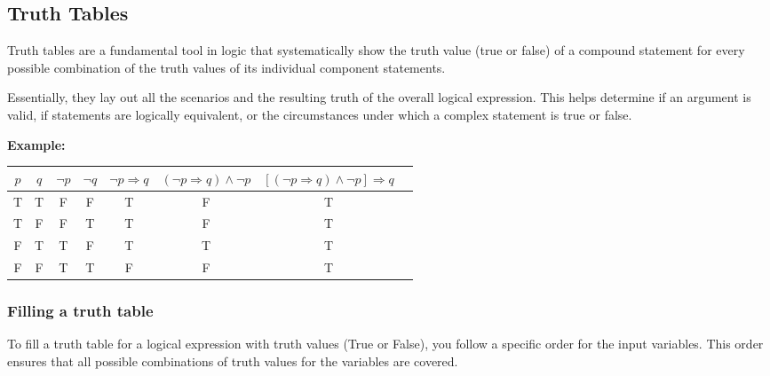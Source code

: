 \subsection{Truth Tables}

Truth tables are a fundamental tool in logic that systematically show the truth value
(true or false) of a compound statement for every possible combination of the truth values of 
its individual component statements.
\vspace{\baselineskip}

Essentially, they lay out all the scenarios and the resulting truth of the overall logical expression.
This helps determine if an argument is valid, if statements are logically equivalent, or the circumstances
under which a complex statement is true or false.
\vspace{\baselineskip}

\textbf{Example:}
\vspace{\baselineskip}


\begin{center}
	\begin{tabular}{|c|c|c|c|c|c|c|c|}
		\hline
		\(p\) & \(q\) & \(\neg p\) & \(\neg q\) & \(\neg p \Rightarrow q\) & \((\neg p \Rightarrow q) \land \neg p\) & \(\left[(\neg p \Rightarrow q) \land \neg p\right] \Rightarrow q\) \\
		\hline
		T   & T   & F        & F        & T                      & F                                     & T                                                                \\
		T   & F   & F        & T        & T                      & F                                     & T                                                                \\
		F   & T   & T        & F        & T                      & T                                     & T                                                                \\
		F   & F   & T        & T        & F                      & F                                     & T                                                                \\
		\hline
	\end{tabular}
\end{center}

\subsubsection{Filling a truth table}
To fill a truth table for a logical expression with truth values (True or False), you follow a specific order for the input variables. This order ensures that all possible combinations of truth values for the variables are covered.

